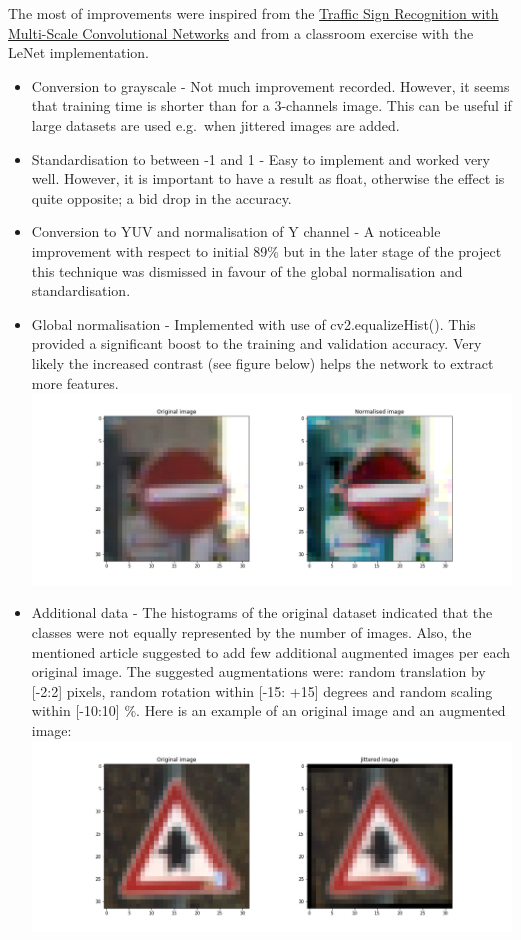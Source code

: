 \documentclass[11pt]{article}
\makeatletter
\def\maxwidth{\ifdim\Gin@nat@width>\linewidth\linewidth
    \else\Gin@nat@width\fi}
\let\Oldincludegraphics\includegraphics
\renewcommand{\includegraphics}[1]{\Oldincludegraphics[width=.8\maxwidth]{#1}}
\makeatother
\begin{document}
The most of improvements were inspired from the
\href{http://yann.lecun.com/exdb/publis/pdf/sermanet-ijcnn-11.pdf}{Traffic
Sign Recognition with Multi-Scale Convolutional Networks} and from a
classroom exercise with the LeNet implementation.

\begin{itemize}
\item
  Conversion to grayscale - Not much improvement recorded. However, it
  seems that training time is shorter than for a 3-channels image. This
  can be useful if large datasets are used e.g.~when jittered images are
  added.
\item
  Standardisation to between -1 and 1 - Easy to implement and worked
  very well. However, it is important to have a result as float,
  otherwise the effect is quite opposite; a bid drop in the accuracy.
\item
  Conversion to YUV and normalisation of Y channel - A noticeable
  improvement with respect to initial 89\% but in the later stage of the
  project this technique was dismissed in favour of the global
  normalisation and standardisation.
\item
  Global normalisation - Implemented with use of cv2.equalizeHist().
  This provided a significant boost to the training and validation
  accuracy. Very likely the increased contrast (see figure below) helps
  the network to extract more features.
  \includegraphics{./images/normalised.png}
\item
  Additional data - The histograms of the original dataset indicated
  that the classes were not equally represented by the number of images.
  Also, the mentioned article suggested to add few additional augmented
  images per each original image. The suggested augmentations were:
  random translation by {[}-2:2{]} pixels, random rotation within
  {[}-15: +15{]} degrees and random scaling within {[}-10:10{]} \%. Here
  is an example of an original image and an augmented image:
  \includegraphics{./images/jittered.png}

\end{itemize}
\end{document}
